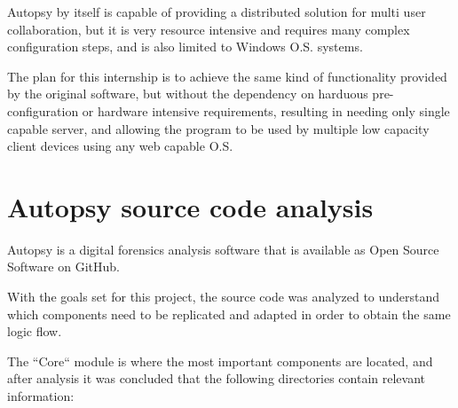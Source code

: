 Autopsy by itself is capable of providing a distributed solution for multi user collaboration, but it is very resource intensive and requires many complex configuration steps,
and is also limited to Windows O.S. systems.

The plan for this internship is to achieve the same kind of functionality provided by the original software, but without the dependency on harduous pre-configuration
or hardware intensive requirements, resulting in needing only single capable server, and allowing the program to be used by multiple low capacity client devices using 
any web capable O.S.

\section{Autopsy source code analysis}

Autopsy is a digital forensics analysis software that is available as Open Source Software on GitHub.

With the goals set for this project, the source code was analyzed to understand which components need to be replicated and adapted in order to obtain the same logic flow.

The ``Core`` module is where the most important components are located, and after analysis it was concluded that the following directories contain relevant information:

